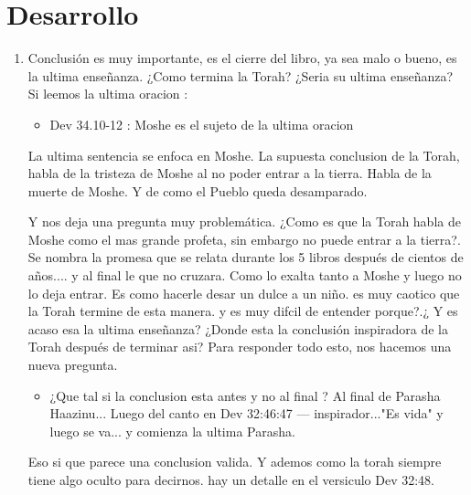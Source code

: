 \documentclass[conference]{IEEEtran}
\begin{document}
\section{Desarrollo}
\begin{enumerate}
\item
Conclusión es muy importante, es el cierre del libro, ya sea malo o bueno, es la ultima enseñanza.
¿Como termina la Torah? ¿Seria su ultima enseñanza?
Si leemos la ultima oracion :
\begin{itemize}
\item Dev 34.10-12 :  Moshe es el sujeto de la ultima oracion 
\end{itemize}
La ultima sentencia se enfoca en Moshe. 
La supuesta conclusion de la Torah, habla de la tristeza de Moshe al no poder entrar a la tierra. 
Habla de la muerte de Moshe. Y de como el Pueblo queda desamparado. 


Y nos deja una pregunta muy problemática. ¿Como es que la Torah habla de Moshe como el mas grande profeta, sin embargo no puede entrar a la tierra?.
Se nombra la promesa que se relata durante los 5 libros después de cientos de años.... y al final 
le que no cruzara. 
Como lo exalta tanto a Moshe y luego no lo deja entrar.
Es como hacerle desar un dulce a un niño. es muy caotico que la Torah termine de esta manera. y es muy difcil de entender  porque?.¿ Y es acaso esa la ultima enseñanza?
¿Donde esta la conclusión inspiradora de la Torah después de terminar asi?
Para responder todo esto, nos hacemos una nueva pregunta. 
\begin{itemize}
\item
¿Que tal si la conclusion esta antes y no al final ?
Al final de Parasha Haazinu...
Luego del canto en Dev 32:46:47 --- inspirador..."Es vida"
y luego se va... y comienza la ultima Parasha.
\end{itemize}
Eso si que parece una conclusion valida.
Y ademos como la torah siempre tiene algo oculto para decirnos. hay un detalle en el versiculo 
 Dev 32:48.





\end{enumerate}
\end{document}
